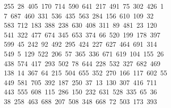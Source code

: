 \begin{tabbing}
\>\ 255\ 28\ 405\ 170\ 714\ 590\ 641\ 217\ 491\ 75\ 302\ 426\ 1\\[0pt]
\ 7\ 687\ 460\ 331\ 536\ 435\ 563\ 284\ 156\ 610\ 109\ 32\ \\[0pt]
\ 583\ 712\ 183\ 388\ 238\ 630\ 408\ 311\ 89\ 481\ 23\ 120\\[0pt]
\>\ 541\ 322\ 477\ 674\ 345\ 653\ 374\ 66\ 520\ 199\ 178\ 397\ \\[0pt]
\ 599\ 45\ 242\ 92\ 492\ 295\ 424\ 227\ 627\ 464\ 691\ 314\\[0pt]
\>\ 549\ 5\ 129\ 522\ 206\ 57\ 365\ 336\ 671\ 619\ 104\ 155\ 26\\[0pt]
\ 438\ 574\ 417\ 293\ 502\ 78\ 644\ 228\ 532\ 327\ 682\ 469\\[0pt]
\>\ 138\ 14\ 367\ 64\ 215\ 504\ 655\ 352\ 270\ 166\ 117\ 602\ 55\\[0pt]
\ 449\ 581\ 705\ 392\ 187\ 250\ 37\ 13\ 130\ 307\ 416\ 711\ \\[0pt]
\ 443\ 555\ 608\ 115\ 286\ 150\ 232\ 631\ 528\ 335\ 65\ 36\\[0pt]
\ 38\ 258\ 463\ 688\ 207\ 508\ 348\ 668\ 72\ 503\ 173\ 393\ \\[0pt]

\end{tabbing}
